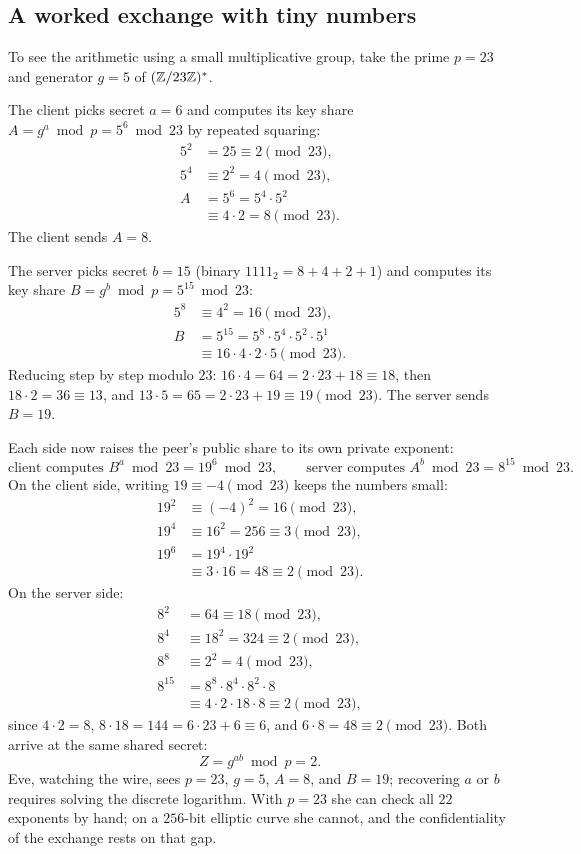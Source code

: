 \subsection{A worked exchange with tiny numbers}

To see the arithmetic using a small multiplicative group, take the prime $p = 23$
and generator $g = 5$ of $(\mathbb{Z}/23\mathbb{Z})^{*}$.

The client picks secret $a = 6$ and computes its key share $A = g^{a} \bmod p = 5^{6} \bmod 23$ by repeated squaring:
\begin{align*}
  5^2 &= 25 \equiv 2 \pmod{23}, \\
  5^4 &\equiv 2^2 = 4 \pmod{23}, \\
  A &= 5^6 = 5^4 \cdot 5^2 \\
    &\equiv 4 \cdot 2 = 8 \pmod{23}.
\end{align*}
The client sends $A = 8$.

The server picks secret $b = 15$ (binary $1111_2 = 8 + 4 + 2 + 1$) and computes its key share $B = g^{b} \bmod p = 5^{15} \bmod 23$:
\begin{align*}
  5^8 &\equiv 4^2 = 16 \pmod{23}, \\
  B &= 5^{15} = 5^8 \cdot 5^4 \cdot 5^2 \cdot 5^1 \\
    &\equiv 16 \cdot 4 \cdot 2 \cdot 5 \pmod{23}.
\end{align*}
Reducing step by step modulo $23$: $16 \cdot 4 = 64 = 2 \cdot 23 + 18 \equiv 18$, then
$18 \cdot 2 = 36 \equiv 13$, and $13 \cdot 5 = 65 = 2 \cdot 23 + 19 \equiv 19 \pmod{23}$.
The server sends $B = 19$.

Each side now raises the peer's public share to its own private exponent:
\[
\text{client computes } B^{a} \bmod 23 = 19^{6} \bmod 23, \qquad
\text{server computes } A^{b} \bmod 23 = 8^{15} \bmod 23.
\]
On the client side, writing $19 \equiv -4 \pmod{23}$ keeps the numbers small:
\begin{align*}
  19^2 &\equiv (-4)^2 = 16 \pmod{23}, \\
  19^4 &\equiv 16^2 = 256 \equiv 3 \pmod{23}, \\
  19^6 &= 19^4 \cdot 19^2 \\
       &\equiv 3 \cdot 16 = 48 \equiv 2 \pmod{23}.
\end{align*}
On the server side:
\begin{align*}
  8^2 &= 64 \equiv 18 \pmod{23}, \\
  8^4 &\equiv 18^2 = 324 \equiv 2 \pmod{23}, \\
  8^8 &\equiv 2^2 = 4 \pmod{23}, \\
  8^{15} &= 8^8 \cdot 8^4 \cdot 8^2 \cdot 8 \\
         &\equiv 4 \cdot 2 \cdot 18 \cdot 8 \equiv 2 \pmod{23},
\end{align*}
since $4 \cdot 2 = 8$, $8 \cdot 18 = 144 = 6 \cdot 23 + 6 \equiv 6$, and
$6 \cdot 8 = 48 \equiv 2 \pmod{23}$. Both arrive at the same shared secret:
\[
Z = g^{ab} \bmod p = 2.
\]
Eve, watching the wire, sees $p = 23$, $g = 5$, $A = 8$, and $B = 19$; recovering $a$
or $b$ requires solving the discrete logarithm. With $p = 23$ she can check all $22$
exponents by hand; on a $256$-bit elliptic curve she cannot, and the confidentiality
of the exchange rests on that gap.

